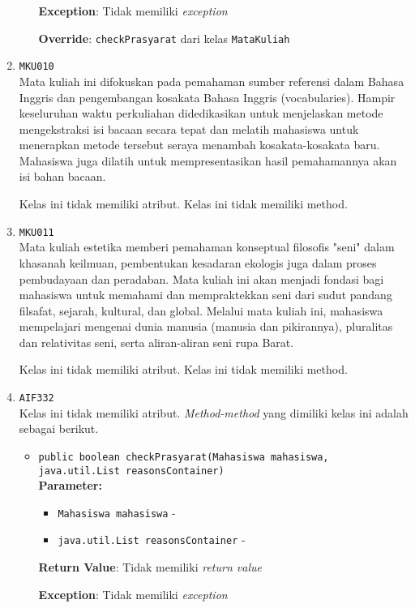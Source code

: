 \documentclass{article}
\begin{document}
\begin{enumerate}
\begin{itemize}
\textbf{Exception}: Tidak memiliki \textit{exception}

\textbf{Override}: \texttt{checkPrasyarat} dari kelas \texttt{MataKuliah}

\end{itemize}
\item \texttt{MKU010}\\ 
Mata kuliah ini difokuskan pada pemahaman sumber referensi dalam Bahasa Inggris dan 
 pengembangan kosakata Bahasa Inggris (vocabularies). Hampir keseluruhan waktu perkuliahan 
 didedikasikan untuk menjelaskan metode mengekstraksi isi bacaan secara tepat dan melatih 
 mahasiswa untuk menerapkan metode tersebut seraya menambah kosakata-kosakata baru. 
 Mahasiswa juga dilatih untuk mempresentasikan hasil pemahamannya akan isi bahan bacaan.

Kelas ini tidak memiliki atribut. Kelas ini tidak memiliki method. \item \texttt{MKU011}\\ 
Mata kuliah estetika memberi pemahaman konseptual filosofis "seni" dalam khasanah keilmuan, 
 pembentukan kesadaran ekologis juga dalam proses pembudayaan dan peradaban. Mata kuliah ini 
 akan menjadi fondasi bagi mahasiswa untuk memahami dan mempraktekkan seni dari sudut pandang
 filsafat, sejarah, kultural, dan global. Melalui mata kuliah ini, mahasiswa mempelajari
 mengenai dunia manusia (manusia dan pikirannya), pluralitas dan relativitas seni, serta 
 aliran-aliran seni rupa Barat.

Kelas ini tidak memiliki atribut. Kelas ini tidak memiliki method. \item \texttt{AIF332}\\ 


Kelas ini tidak memiliki atribut. \textit{Method-method} yang dimiliki kelas ini adalah sebagai berikut.
\begin{itemize}
\item \texttt{public boolean checkPrasyarat(Mahasiswa mahasiswa, java.util.List reasonsContainer)}\\ 


\textbf{Parameter:}\begin{itemize}
\item \texttt{Mahasiswa mahasiswa} - 
\item \texttt{java.util.List reasonsContainer} - 
\end{itemize}
\textbf{Return Value}: Tidak memiliki \textit{return value}

\textbf{Exception}: Tidak memiliki \textit{exception}


\end{itemize}
\end{enumerate}
\end{document}
